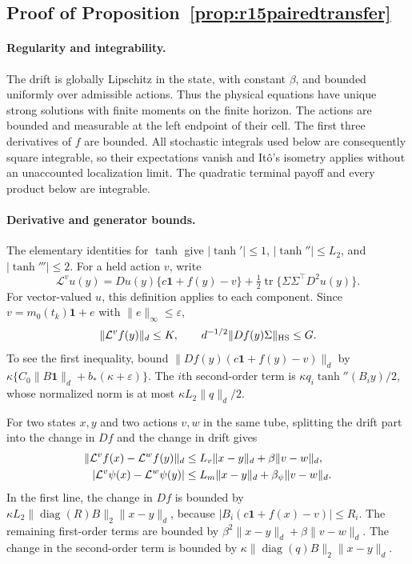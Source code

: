 \subsection{Proof of Proposition~\ref{prop:r15pairedtransfer}}

\paragraph*{Regularity and integrability.}
The drift is globally Lipschitz in the state, with constant $\beta$, and
bounded uniformly over admissible actions. Thus the physical equations have
unique strong solutions with finite moments on the finite horizon. The
actions are bounded and measurable at the left endpoint of their cell.
The first three derivatives of $f$ are bounded. All stochastic integrals
used below are consequently square integrable, so their expectations vanish
and It\^o's isometry applies without an unaccounted localization limit.
The quadratic terminal payoff and every product below are integrable.

\paragraph*{Derivative and generator bounds.}
The elementary identities for $\tanh$ give
$|\tanh'|\leq1$, $|\tanh''|\leq L_2$, and
$|\tanh'''|\leq2$. For a held action $v$, write
\[
 \mathcal L^v u(y)
 =Du(y)\{c\bm1+f(y)-v\}
            +\tfrac12\operatorname{tr}\{\Sigma\Sigma^\top D^2u(y)\}.
\]
For vector-valued $u$, this definition applies to each component.
Since $v=m_0(t_k)\bm1+e$ with $\|e\|_\infty\leq\varepsilon$,
\[
 \|\mathcal L^v f(y)\|_d\leq K,
 \qquad d^{-1/2}\|Df(y)\Sigma\|_{\rm HS}\leq G.
\]
To see the first inequality, bound
$\|Df(y)(c\bm1+f(y)-v)\|_d$ by
$\kappa\{C_0\|B\bm1\|_d+b_*(\kappa+\varepsilon)\}$.
The $i$th second-order term is
$\kappa q_i\tanh''(B_i y)/2$, whose normalized norm is at most
$\kappa L_2\|q\|_d/2$.

For two states $x,y$ and two actions $v,w$ in the same tube, splitting
the drift part into the change in $Df$ and the change in drift gives
\begin{align}
 \|\mathcal L^v f(x)-\mathcal L^w f(y)\|_d
          &\leq L_v\|x-y\|_d+\beta\|v-w\|_d,\notag\\
 |\mathcal L^v\psi(x)-\mathcal L^w\psi(y)|
          &\leq L_m\|x-y\|_d+\beta_\psi\|v-w\|_d.
 \label{eq:r15pairedgeneratorbounds}
\end{align}
In the first line, the change in $Df$ is bounded by
$\kappa L_2\|\operatorname{diag}(R)B\|_2\|x-y\|_d$,
because $|B_i(c\bm1+f(x)-v)|\leq R_i$.
The remaining first-order terms are bounded by
$\beta^2\|x-y\|_d+\beta\|v-w\|_d$.
The change in the second-order term is bounded by
$\kappa\|\operatorname{diag}(q)B\|_2\|x-y\|_d$.


